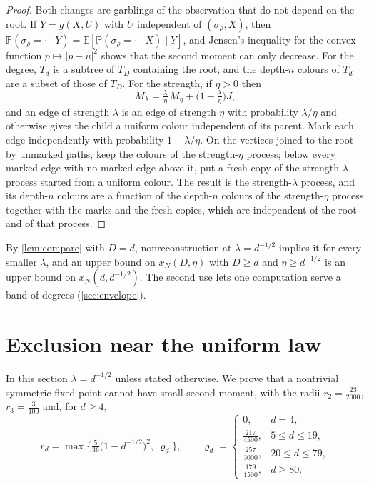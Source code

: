 \documentclass[11pt]{amsart}
\theoremstyle{definition}
\theoremstyle{remark}
\newcommand{\E}{\mathbb{E}}
\newcommand{\PP}{\mathbb{P}}
\begin{document}
\begin{proof}
Both changes are garblings of the observation that do not depend on the root. If $Y=g(X,U)$ with $U$
independent of $(\sigma_\rho,X)$, then $\PP(\sigma_\rho=\cdot\mid Y)=\E[\PP(\sigma_\rho=\cdot\mid X)\mid Y]$,
and Jensen's inequality for the convex function $p\mapsto|p-u|^2$ shows that the second moment can only
decrease. For the degree, $T_d$ is a subtree of $T_D$ containing the root, and the depth-$n$ colours of
$T_d$ are a subset of those of $T_D$. For the strength, if $\eta>0$ then
\[
M_\lambda=\tfrac\lambda\eta\,M_\eta+\big(1-\tfrac\lambda\eta\big)J,
\]
and an edge of strength $\lambda$ is an edge of strength $\eta$ with probability $\lambda/\eta$ and
otherwise gives the child a uniform colour independent of its parent. Mark each edge independently with
probability $1-\lambda/\eta$. On the vertices joined to the root by unmarked paths, keep the colours of the
strength-$\eta$ process; below every marked edge with no marked edge above it, put a fresh copy of the
strength-$\lambda$ process started from a uniform colour. The result is the strength-$\lambda$ process, and
its depth-$n$ colours are a function of the depth-$n$ colours of the strength-$\eta$ process together with
the marks and the fresh copies, which are independent of the root and of that process.
\end{proof}

By \cref{lem:compare} with $D=d$, nonreconstruction at $\lambda=d^{-1/2}$ implies it for every smaller
$\lambda$, and an upper bound on $x_N(D,\eta)$ with $D\ge d$ and $\eta\ge d^{-1/2}$ is an upper bound on
$x_N(d,d^{-1/2})$. The second use lets one computation serve a band of degrees (\cref{sec:envelope}).

\section{Exclusion near the uniform law}\label{sec:local}

In this section $\lambda=d^{-1/2}$ unless stated otherwise. We prove that a nontrivial symmetric fixed point
cannot have small second moment, with the radii $r_2=\tfrac{23}{2000}$, $r_3=\tfrac{3}{100}$ and, for $d\ge4$,
\begin{equation}\label{eq:radii}
r_d=\max\Big\{\tfrac5{36}\big(1-d^{-1/2}\big)^2,\ \varrho_d\Big\},\qquad
\varrho_d=\begin{cases}0,&d=4,\\ \tfrac{217}{4500},&5\le d\le19,\\ \tfrac{257}{3000},&20\le d\le79,\\
\tfrac{179}{1500},&d\ge80.\end{cases}
\end{equation}
\end{document}
